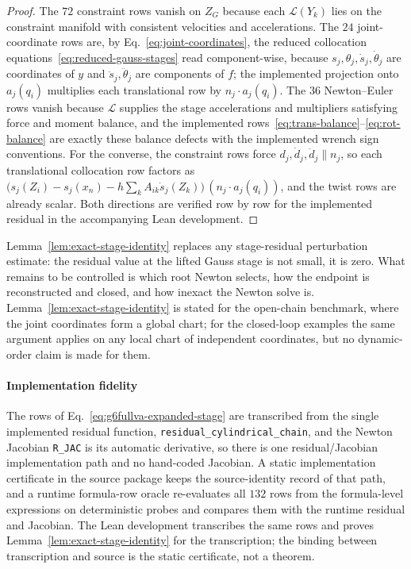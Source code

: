 \documentclass[preprint,12pt]{elsarticle}
\begin{document}
\begin{proof}
The $72$ constraint rows vanish on $Z_G$ because each $\mathcal L(Y_k)$ lies
on the constraint manifold with consistent velocities and accelerations. The
$24$ joint-coordinate rows are, by Eq.~\eqref{eq:joint-coordinates}, the
reduced collocation equations~\eqref{eq:reduced-gauss-stages} read
component-wise, because $s_j,\theta_j,\dot s_j,\dot\theta_j$ are coordinates
of $y$ and $\ddot s_j,\ddot\theta_j$ are components of $f$; the implemented
projection onto $a_j(q_i)$ multiplies each translational row by
$n_j\cdot a_j(q_i)$. The $36$ Newton--Euler rows vanish because $\mathcal L$
supplies the stage accelerations and multipliers satisfying force and moment
balance, and the implemented rows~\eqref{eq:trans-balance}--\eqref{eq:rot-balance}
are exactly these balance defects with the implemented wrench sign
conventions. For the converse, the constraint rows force
$d_j,\dot d_j,\ddot d_j\parallel n_j$, so each translational collocation row
factors as $\bigl(s_j(Z_i)-s_j(x_n)-h\sum_kA_{ik}\dot s_j(Z_k)\bigr)\,
(n_j\cdot a_j(q_i))$, and the twist rows are already scalar. Both directions
are verified row by row for the implemented residual in the accompanying Lean
development.
\end{proof}

Lemma~\ref{lem:exact-stage-identity} replaces any stage-residual
perturbation estimate: the residual value at the lifted Gauss stage is not
small, it is zero. What remains to be controlled is which root Newton
selects, how the endpoint is reconstructed and closed, and how inexact the
Newton solve is. Lemma~\ref{lem:exact-stage-identity} is stated for the
open-chain benchmark, where the joint coordinates form a global chart; for
the closed-loop examples the same argument applies on any local chart of
independent coordinates, but no dynamic-order claim is made for them.

\paragraph{Implementation fidelity}
The rows of Eq.~\eqref{eq:g6fullva-expanded-stage} are transcribed from the
single implemented residual function, \texttt{residual\_cylindrical\_chain},
and the Newton Jacobian \texttt{R\_JAC} is its automatic derivative, so
there is one residual/Jacobian implementation path and no hand-coded
Jacobian. A static implementation certificate in the source package keeps
the source-identity record of that path, and a runtime formula-row oracle
re-evaluates all $132$ rows from the formula-level expressions on
deterministic probes and compares them with the runtime residual and
Jacobian. The Lean development transcribes the same rows and proves
Lemma~\ref{lem:exact-stage-identity} for the transcription; the binding
between transcription and source is the static certificate, not a theorem.
\end{document}

